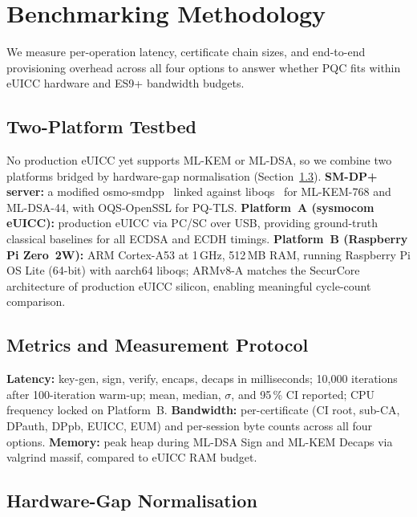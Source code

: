 \documentclass[final,3p,times,twocolumn]{elsarticle}
\begin{document}
\section{Benchmarking Methodology}\label{sec:methodology}

We measure per-operation latency, certificate chain sizes, and end-to-end
provisioning overhead across all four options to answer whether PQC fits
within eUICC hardware and ES9+ bandwidth budgets.

\subsection{Two-Platform Testbed}\label{sec:meth-testbed}

No production eUICC yet supports ML-KEM or ML-DSA, so we combine two
platforms bridged by hardware-gap normalisation
(Section~\ref{sec:meth-normalization}).
\textbf{SM-DP+ server:} a modified osmo-smdpp~\citep{osmo_smdpp} linked
against liboqs~\citep{oqs2024} for ML-KEM-768 and ML-DSA-44, with
OQS-OpenSSL for PQ-TLS.
\textbf{Platform~A (sysmocom eUICC):} production eUICC via PC/SC over USB,
providing ground-truth classical baselines for all ECDSA and ECDH timings.
\textbf{Platform~B (Raspberry Pi Zero~2W):} ARM Cortex-A53 at 1\,GHz,
512\,MB RAM, running Raspberry Pi OS Lite (64-bit) with aarch64 liboqs;
ARMv8-A matches the SecurCore architecture of production eUICC silicon,
enabling meaningful cycle-count comparison.

\subsection{Metrics and Measurement Protocol}\label{sec:meth-metrics}

\textbf{Latency:} key-gen, sign, verify, encaps, decaps in milliseconds;
10{,}000 iterations after 100-iteration warm-up; mean, median, $\sigma$,
and 95\,\% CI reported; CPU frequency locked on Platform~B.
\textbf{Bandwidth:} per-certificate (CI root, sub-CA, DPauth, DPpb, EUICC,
EUM) and per-session byte counts across all four options.
\textbf{Memory:} peak heap during ML-DSA Sign and ML-KEM Decaps via valgrind
massif, compared to eUICC RAM budget.

\subsection{Hardware-Gap Normalisation}\label{sec:meth-normalization}
\end{document}
